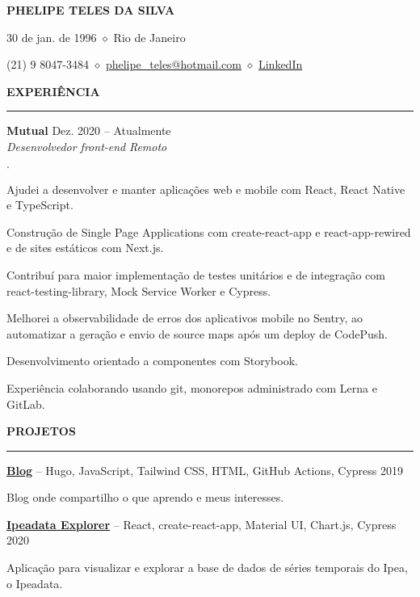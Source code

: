\documentclass[11pt,letterpaper]{article}
\newenvironment{tightlist}
  {\begin{list}
    {$\cdot$}
    {
      \setlength{\leftmargin}{0em}
      \setlength{\itemsep}{-0.5em}
    }
    \smallskip
  }
{\end{list}}
\begin{document}
\pagestyle{empty}

\centerline{\huge\bf PHELIPE TELES DA SILVA}
\medskip

\centerline{30 de jan. de 1996 $\diamond$ Rio de Janeiro}
\smallskip

\centerline{
  (21) 9 8047-3484 $\diamond$
  \href{mailto:phelipe_teles@hotmail.com}{phelipe\_teles@hotmail.com} $\diamond$ \href{https://linkedin.com/in/phelipeteles}{LinkedIn}
}
\smallskip

\medskip \textbf{EXPERIÊNCIA} \medskip
\hrule

\textbf{Mutual} \hfill Dez. 2020 -- Atualmente \\
\emph{Desenvolvedor front-end} \hfill \emph{Remoto} {\parfillskip=0pt\par}

\begin{tightlist}
  \item Ajudei a desenvolver e manter aplicações web e mobile com React, React
    Native e TypeScript.
  \item Construção de Single Page Applications com create-react-app e
    react-app-rewired e de sites estáticos com Next.js.
  \item Contribuí para maior implementação de testes unitários e de integração
    com react-testing-library, Mock Service Worker e Cypress.
  \item Melhorei a observabilidade de erros dos aplicativos mobile no Sentry, ao
    automatizar a geração e envio de source maps após um deploy de CodePush.
  \item Desenvolvimento orientado a componentes com Storybook.
  \item Experiência colaborando usando git, monorepos administrado com Lerna e
    GitLab.
\end{tightlist}

\medskip \textbf{PROJETOS} \medskip
\hrule

\textbf{\href{https://phelipetls.github.io}{Blog}} -- Hugo, JavaScript, Tailwind CSS, HTML, GitHub Actions, Cypress \hfill 2019
{\parfillskip=0pt\par}
Blog onde compartilho o que aprendo e meus interesses.

\medskip

\textbf{\href{http://ipeadata-explorer.surge.sh}{Ipeadata Explorer}} -- React, create-react-app, Material UI, Chart.js, Cypress \hfill 2020
{\parfillskip=0pt\par}
Aplicação para visualizar e explorar a base de dados de séries temporais
  do Ipea, o Ipeadata.
\end{document}
